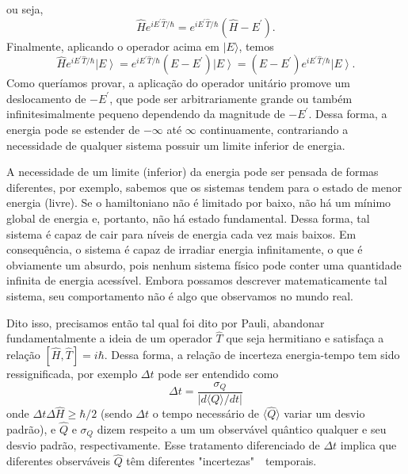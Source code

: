 ou seja, 
\begin{equation}\label{eq1.12}
     \hat{H} e^{iE^\prime \hat{T}/\hbar} = e^{iE^\prime \hat{T}/\hbar}(\hat{H} - E^\prime).
\end{equation}
Finalmente, aplicando o operador acima em $| E \rangle$, temos
\begin{equation}\label{eq1.13}
    \hat{H} e^{iE^\prime \hat{T}/\hbar}\left | E \right \rangle = e^{iE^\prime \hat{T}/\hbar} (E - E^\prime)\left | E \right \rangle = (E - E^\prime)e^{iE^\prime \hat{T}/\hbar}\left | E \right \rangle.
\end{equation}
Como queríamos provar, a aplicação do operador unitário promove um deslocamento de $-E^\prime$, que pode ser arbitrariamente grande ou também infinitesimalmente pequeno dependendo da magnitude de $-E^{\prime}$. Dessa forma, a energia pode se estender de $-\infty$ até $\infty$ continuamente, contrariando a necessidade de qualquer sistema possuir um limite inferior de energia. 

A necessidade de um limite (inferior) da energia pode ser pensada de formas diferentes, por exemplo, sabemos que os sistemas tendem para o estado de menor energia (livre). Se o hamiltoniano não é limitado por baixo, não há um mínimo global de energia e, portanto, não há estado fundamental. Dessa forma, tal sistema é capaz de cair para níveis de energia cada vez mais baixos. Em consequência, o sistema é capaz de irradiar energia infinitamente, o que é obviamente um absurdo, pois nenhum sistema físico pode conter uma quantidade infinita de energia acessível. Embora possamos descrever matematicamente tal sistema, seu comportamento não é algo que observamos no mundo real.

Dito isso, precisamos então tal qual foi dito por Pauli, abandonar fundamentalmente a ideia de um operador $\hat{T}$ que seja hermitiano e satisfaça a relação $\left[ \hat{H}, \hat{T} \right] = i \hbar$. Dessa forma, a relação de incerteza energia-tempo tem sido ressignificada, por exemplo $\Delta t$ pode ser entendido como
\begin{equation}\label{eq1.14}
    \Delta t = \frac{\sigma_{Q}}{|d \langle Q \rangle / d t|}
\end{equation}
onde $\Delta t \Delta \hat{H} \geqslant \hbar / 2$ (sendo $\Delta t$ o tempo necessário de $\langle \hat{Q} \rangle$ variar um desvio padrão), e $\hat{Q}$ e $\sigma_{Q}$ dizem respeito a um um observável quântico qualquer e seu desvio padrão, respectivamente. Esse tratamento diferenciado de $\Delta t$ implica que diferentes observáveis $\hat{Q}$ têm diferentes "incertezas" $\text{ }$temporais.

